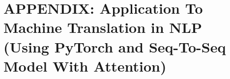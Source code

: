 \section{APPENDIX: Application To Machine Translation in NLP (Using PyTorch and Seq-To-Seq Model With Attention)} \label{app:Appendix_Seq2Seq}

